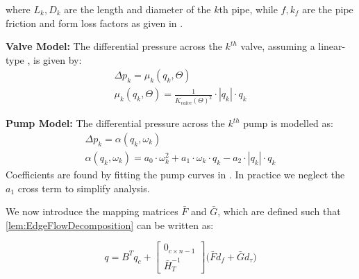 where $L_k, D_k$ are the length and diameter of the $k$th pipe, while $f,k_f$ are the pipe friction and form loss factors as given in \cite{Swamee2008}.

\textbf{Valve Model:}
The differential pressure across the $ k^{th} $ valve, assuming a linear-type \cite{Swamee2008}, is given by:
\begin{equation}\label{eq:ValveModel}
	\begin{gathered}
		\Delta p_{k} = \mu_k(q_k,\Theta) \\ 
		\mu_k(q_k,\Theta) = \frac{1}{K_{valve}(\Theta)^2} \cdot |q_k|\cdot q_k
	\end{gathered}
\end{equation}

\textbf{Pump Model:}
The differential pressure across the $ k^{th} $ pump is modelled as:
\begin{equation}\label{eq:PumpPressure}
	\begin{gathered}
		\Delta p_{k} =   \alpha(q_k,\omega_k) \\
		\alpha(q_k,\omega_k) = a_0\cdot \omega_k^2 +  a_1\cdot \omega_k \cdot q_k -a_2\cdot |q_k|\cdot q_k
	\end{gathered}
\end{equation}
Coefficients are found by fitting the pump curves in \cite{GrundfosDatablad}. In practice we neglect the $ a_1 $ cross term to simplify analysis.



We now introduce the mapping matrices $\bar{F}$ and $\bar{G}$, which are defined such that \cref{lem:EdgeFlowDecomposition} can be written as:

\begin{equation}\label{eq:FlowDecomposition}
		q = B^T q_c +
	\begin{bmatrix}
		0_{c \times n-1} \\ \bar{H}_T^{-1} 
	\end{bmatrix}
	\Big(\bar{F}d_f + \bar{G}d_\tau \Big)
\end{equation}

